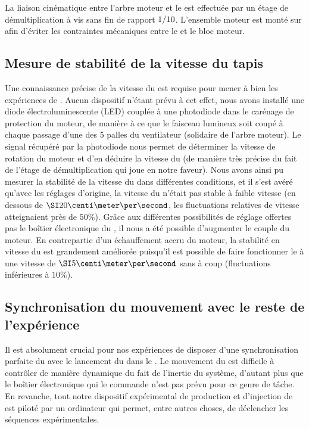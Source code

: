La liaison cinématique entre l'arbre moteur et le \conv est effectuée par un étage de démultiplication à vis sans fin de rapport ${{1} / {10}}$. L'ensemble moteur est monté sur  afin d'éviter les contraintes mécaniques entre le \conv et le bloc moteur.

\EnFaitNon
{
\subsection{Mesure de stabilité de la vitesse du tapis}
Une connaissance précise de la vitesse du \conv est requise pour mener à bien les expériences de \mimo. 
Aucun dispositif n'étant prévu à cet effet, nous avons installé une diode électroluminescente (LED) couplée à une photodiode dans le carénage de protection du moteur, de manière à ce que le faisceau lumineux soit coupé à chaque passage d'une des 5 palles du ventilateur (solidaire de l'arbre moteur). 
Le signal  récupéré par la photodiode nous permet de déterminer la vitesse de rotation du moteur et d'en déduire la vitesse du \conv (de manière très précise du fait de l'étage de démultiplication qui joue en notre faveur). 
Nous avons ainsi pu mesurer la stabilité de la vitesse du \conv dans différentes conditions, et il s'est avéré qu'avec les réglages d'origine, la vitesse du \conv n'était pas stable à faible vitesse (en dessous de $\cmps{20}$, les fluctuations relatives de vitesse atteignaient près de $50$\%). 
Grâce aux différentes possibilités de réglage offertes pas le boîtier électronique du \conv, il nous a été possible d'augmenter le couple du moteur. En contrepartie d'un échauffement accru du moteur, la stabilité en vitesse du \conv est grandement améliorée puisqu'il est possible de faire fonctionner le \conv à une vitesse de $\cmps{5}$ sans à coup (fluctuations inférieures à $10$\%).
}

{\AjouteLigne}

\subsection{Synchronisation du mouvement avec le reste de l'expérience}

Il est absolument crucial pour nos expériences de disposer d'une synchronisation parfaite du \mimo avec le lancement du \pat dans le \gm. Le mouvement du \conv est difficile à contrôler de manière dynamique du fait de l'inertie du système, d'autant plus que le boîtier électronique qui le commande n'est pas prévu pour ce genre de tâche. En revanche, tout notre dispositif expérimental de production et d'injection de \pats est piloté par un ordinateur  qui permet, entre autres choses, de déclencher les séquences expérimentales. 

